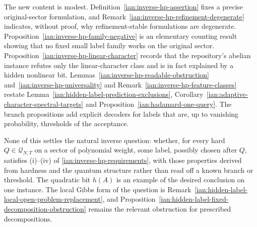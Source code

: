 \begin{remark}
\label{ian:inverse-hp-contribution}
The new content is modest. Definition~\ref{ian:inverse-hp-assertion} fixes a precise original-sector formulation, and Remark~\ref{ian:inverse-hp-refinement-degenerate} indicates, without proof, why refinement-stable formulations are degenerate. Proposition~\ref{ian:inverse-hp-family-negative} is an elementary counting result showing that no fixed small label family works on the original sector. Proposition~\ref{ian:inverse-hp-linear-character} records that the repository's abelian instance refutes only the linear-character class and is in fact explained by a hidden nonlinear bit. Lemmas~\ref{ian:inverse-hp-readable-obstruction} and~\ref{ian:inverse-hp-universality} and Remark~\ref{ian:inverse-hp-feature-classes} restate Lemma~\ref{ian:hidden-label-prediction-exclusions}, Corollary~\ref{ian:adaptive-character-spectral-targets} and Proposition~\ref{ian:hadamard-one-query}. The branch propositions add explicit decoders for labels that are, up to vanishing probability, thresholds of the acceptance.

None of this settles the natural inverse question: whether, for every hard \(Q\in\mathcal Q_{N,T}\) on a sector of polynomial weight, some label, possibly chosen after \(Q\), satisfies (i)--(iv) of \eqref{ian:inverse-hp-requirements}, with those properties derived from hardness and the quantum structure rather than read off a known branch or threshold. The quadratic bit \(h(A)\) is an example of the desired conclusion on one instance. The local Gibbs form of the question is Remark~\ref{ian:hidden-label-local-open-problem-replacement}, and Proposition~\ref{ian:hidden-label-fixed-decomposition-obstruction} remains the relevant obstruction for prescribed decompositions.
\end{remark}
